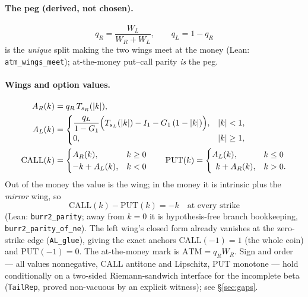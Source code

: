 \documentclass[11pt]{article}
\begin{document}
\paragraph{The peg (derived, not chosen).}
\begin{equation}
q_R = \frac{W_L}{W_R + W_L}, \qquad q_L = 1 - q_R
\end{equation}
is the \emph{unique} split making the two wings meet at the money
(Lean: \texttt{atm\_wings\_meet}); at-the-money put--call parity \emph{is} the peg.

\paragraph{Wings and option values.}
\begin{align}
A_R(k) &= q_R\,T_{s_R}(|k|), \\
A_L(k) &= \begin{cases}
\dfrac{q_L}{1-G_1}\Bigl(T_{s_L}(|k|) - I_1 - G_1\,(1-|k|)\Bigr), & |k| < 1,\\[4pt]
0, & |k| \ge 1,
\end{cases}\\
\mathrm{CALL}(k) &= \begin{cases} A_R(k), & k \ge 0\\ -k + A_L(k), & k<0\end{cases}
\qquad
\mathrm{PUT}(k) = \begin{cases} A_L(k), & k \le 0\\ \;\,k + A_R(k), & k>0.\end{cases}
\end{align}
Out of the money the value is the wing; in the money it is intrinsic plus the \emph{mirror}
wing, so
\begin{equation}
\boxed{\;\mathrm{CALL}(k) - \mathrm{PUT}(k) = -k \quad\text{at every strike}\;}
\tag{parity}
\end{equation}
(Lean: \texttt{burr2\_parity}; away from $k=0$ it is hypothesis-free branch bookkeeping,
\texttt{burr2\_parity\_of\_ne}). The left wing's closed form already vanishes at the zero-strike
edge (\texttt{AL\_glue}), giving the exact anchors $\mathrm{CALL}(-1)=1$ (the whole coin) and
$\mathrm{PUT}(-1)=0$. The at-the-money mark is $\mathrm{ATM} = q_R W_R$. Sign and order
--- all values nonnegative, $\mathrm{CALL}$ antitone and Lipschitz, $\mathrm{PUT}$ monotone ---
hold conditionally on a two-sided Riemann-sandwich interface for the incomplete beta
(\texttt{TailRep}, proved non-vacuous by an explicit witness); see \S\ref{sec:gaps}.
\end{document}
